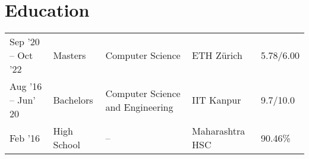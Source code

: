 %
%
%
%
\section*{Education}
\begin{tabulary}{\textwidth}{L L L L L}

\toprule
{} &  &  &  & \\
\midrule
Sep '20 -- Oct '22 & Masters & Computer Science & ETH Zürich & 5.78/6.00\\%
Aug '16 -- Jun' 20 & Bachelors & Computer Science and Engineering & IIT Kanpur & 9.7/10.0\\%
Feb '16 & High School & -- & Maharashtra HSC & 90.46\%\\%
\bottomrule

\end{tabulary}
